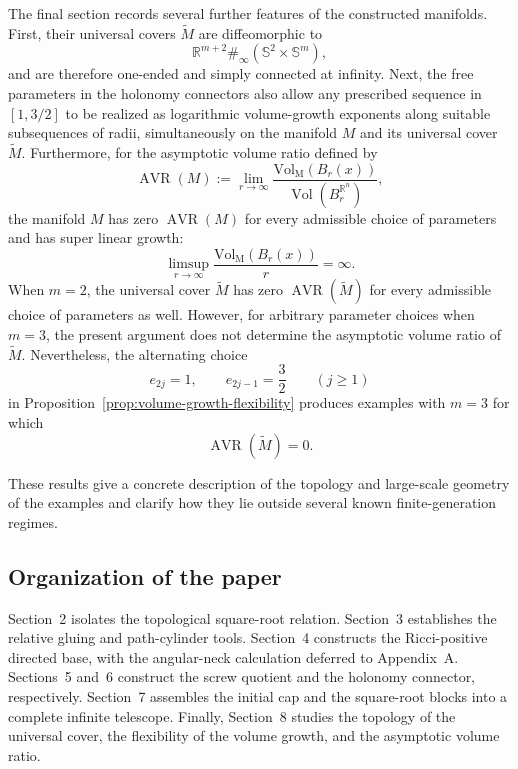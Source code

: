 \documentclass[11pt,reqno]{amsart}
\theoremstyle{definition}
\numberwithin{equation}{section}
\begin{document}
The final section records several further features of the constructed
manifolds. First, their universal covers $\widetilde M$ are diffeomorphic to
\[
 \mathbb R^{m+2}\#_{\infty}
 (\mathbb S^2\times\mathbb S^m),
\]
and are therefore one-ended and simply connected at infinity.  Next, the
free parameters in the holonomy connectors also allow any prescribed
sequence in \([1,3/2]\) to be realized as logarithmic volume-growth
exponents along suitable subsequences of radii, simultaneously on the
manifold $M$ and its universal cover $\widetilde M$. Furthermore, for the asymptotic volume ratio defined by
\begin{equation*}
    \operatorname{AVR}(M):=\lim_{r\to\infty}
 \frac{\operatorname{Vol_M}(B_r(x))}
 {\operatorname{Vol}(B_r^{\mathbb R^n})},
\end{equation*}
the manifold $M$ has zero $\operatorname{AVR}(M)$ for every admissible choice of
parameters and has super linear growth:
\begin{equation*}
    \limsup_{r\to \infty} \frac{\operatorname{Vol_M}(B_r(x))}{r}=\infty.
\end{equation*}
When \(m=2\), the universal cover $\widetilde M$ has zero $\operatorname{AVR}(\widetilde M)$
for every admissible choice of parameters as well. However, for arbitrary parameter choices when \(m=3\), the present argument does not determine the asymptotic volume ratio of \(\widetilde M\). Nevertheless, the alternating choice \[ e_{2j}=1, \qquad e_{2j-1}=\frac32 \qquad (j\ge1) \] in Proposition~\ref{prop:volume-growth-flexibility} produces examples with \(m=3\) for which \[ \operatorname{AVR}(\widetilde M)=0. \]


These results give a concrete
description of the topology and large-scale geometry of the examples
and clarify how they lie outside several known finite-generation
regimes.

\subsection*{Organization of the paper}

Section~2 isolates the topological square-root relation.
Section~3 establishes the relative gluing and path-cylinder tools.
Section~4 constructs the Ricci-positive directed base, with the
angular-neck calculation deferred to Appendix~A.
Sections~5 and~6 construct the screw quotient and the holonomy
connector, respectively.
Section~7 assembles the initial cap and the square-root blocks into a
complete infinite telescope.
Finally, Section~8 studies the topology of the universal cover, the
flexibility of the volume growth, and the asymptotic volume ratio.
\end{document}
